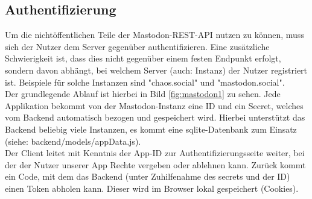 \documentclass[fleqn,10pt]{SelfArx} %
\begin{document}
\subsection{Authentifizierung}
Um die nichtöffentlichen Teile der Mastodon-REST-API nutzen zu können, muss sich der Nutzer dem Server gegenüber authentifizieren. Eine zusätzliche Schwierigkeit ist, dass dies nicht gegenüber einem festen Endpunkt erfolgt, sondern davon abhängt, bei welchem Server (auch: Instanz) der Nutzer registriert ist. Beispiele für solche Instanzen sind "chaos.social" und "mastodon.social". \\
Der grundlegende Ablauf ist hierbei in Bild \ref{fig:mastodon1} zu sehen. Jede Applikation bekommt von der Mastodon-Instanz eine ID und ein Secret, welches vom Backend automatisch bezogen und gespeichert wird. Hierbei unterstützt das Backend beliebig viele Instanzen, es kommt eine sqlite-Datenbank zum Einsatz (siehe: backend/models/appData.js).\\ Der Client leitet mit Kenntnis der App-ID zur Authentifizierungsseite weiter, bei der der Nutzer unserer App Rechte vergeben oder ablehnen kann. Zurück kommt ein Code, mit dem das Backend (unter Zuhilfenahme des secrets und der ID) einen Token abholen kann. Dieser wird im Browser lokal gespeichert (Cookies).
\end{document}
